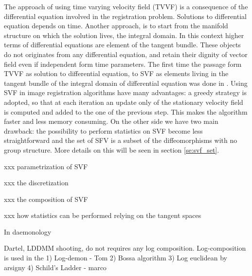 The approach of using time varying velocity field (TVVF) is a consequence of the differential equation involved in the registration problem. Solutions to differential equation depends on time. Another approach, is to start from the manifold structure on which the solution lives, the integral domain. In this context higher terms of differential equations are element of the tangent bundle. These objects do not originates from any differential equation, and retain their dignity of vector field even if independent form time parameters. The first time the passage form TVVF as solution to differential equation, to SVF as elements living in the tangent bundle of the integral domain of differential equation was done in \cite{arsigny2006log}. Using SVF in image registration algorithms have many advantages: a greedy strategy is adopted, so that at each iteration an update only of the stationary velocity field is computed and added to the one of the previous step. This makes the algorithm faster and less memory consuming. On the other side we have two main drawback: the possibility to perform statistics on SVF become less straightforward and the set of SFV is a subset of the diffeomorphisms with no group structure. More details on this will be seen in section \ref{se:svf_set}.

xxx parametrization of SVF

xxx the discretization

xxx the composition of SVF 

xxx how statistics can be performed relying on the tangent spaces





In daemonology 

Dartel, LDDMM shooting, do not requires any log composition.
Log-composition is used in the 
1) Log-demon  - Tom
2) Bossa algorithm
3) Log euclidean by arsigny
4) Schild's Ladder - marco



